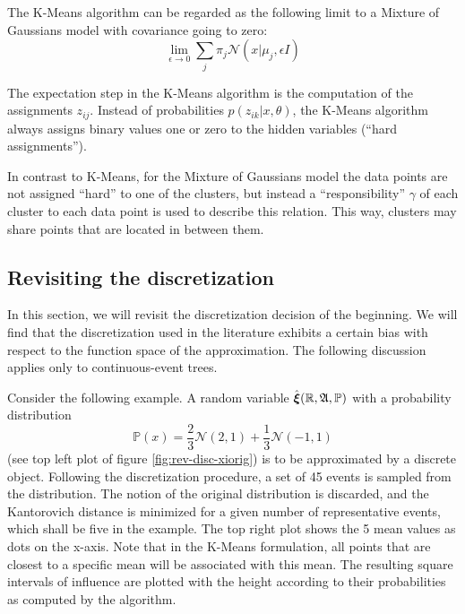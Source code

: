 The K-Means algorithm can be regarded as the following limit to a Mixture of Gaussians model with covariance going to zero:
\begin{equation}
  \label{eq:23}
  \lim\limits_{\epsilon\rightarrow 0}\sum_j\pi_j\mathcal{N}(x| \mu_j,\epsilon I)
\end{equation}

The expectation step in the K-Means algorithm is the computation of the assignments $z_{ij}$.
Instead of probabilities $p(z_{ik}|x,\theta)$, the K-Means algorithm always assigns binary values one or zero to the hidden variables (``hard assignments'').

In contrast to K-Means, for the Mixture of Gaussians model the data points are not assigned ``hard'' to one of the clusters, but instead a ``responsibility'' $\gamma$ of each cluster to each data point is used to describe this relation.
This way, clusters may share points that are located in between them.
\subsection{Revisiting the discretization}
\label{sec:revisiting-discretization}
In this section, we will revisit the discretization decision of the beginning.
We will find that the discretization used in the literature exhibits a certain bias with respect to the function space of the approximation.
The following discussion applies only to continuous-event trees.

Consider the following example.
A random variable $\hat{\boldsymbol\xi}(\mathbb{R}, \mathfrak{A}, \mathbb{P})$ with a probability distribution
\begin{equation}
  \label{eq:24}
  \mathbb{P}(x) = \frac{2}{3}\mathcal{N}(2,1) + \frac{1}{3}\mathcal{N}(-1,1)
\end{equation}
(see top left plot of figure \ref{fig:rev-disc-xiorig}) is to be approximated by a discrete object.
Following the discretization procedure, a set of 45 events is sampled from the distribution.
The notion of the original distribution is discarded, and the Kantorovich distance is minimized for a given number of representative events, which shall be five in the example.
The top right plot shows the 5 mean values as dots on the x-axis.
Note that in the K-Means formulation, all points that are closest to a specific mean will be associated with this mean.
The resulting square intervals of influence are plotted with the height according to their probabilities as computed by the algorithm.

